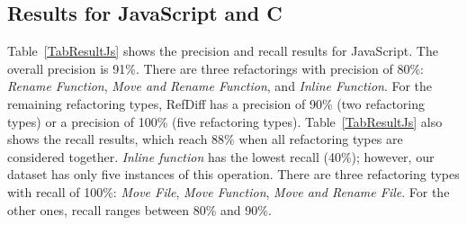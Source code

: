 \subsection{Results for JavaScript and C}
\label{sec:eval:js:c:results}

Table~\ref{TabResultJs} shows the precision and recall results for JavaScript. The overall precision is 91\%. There are three refactorings with precision of 80\%: \textit{Rename Function}, \textit{Move and Rename Function}, and \textit{Inline Function}. For the remaining refactoring types, RefDiff has a precision of 90\% (two refactoring types) or a precision of 100\% (five refactoring types). Table~\ref{TabResultJs} also shows the recall results, which reach 88\% when all refactoring types are considered together.
\textit{Inline function} has the lowest recall (40\%); however, our dataset has only five instances of this operation. There are three refactoring types with recall of 100\%: \textit{Move File}, \textit{Move Function}, \textit{Move and Rename File}. For the other ones, recall ranges between 80\% and 90\%.




